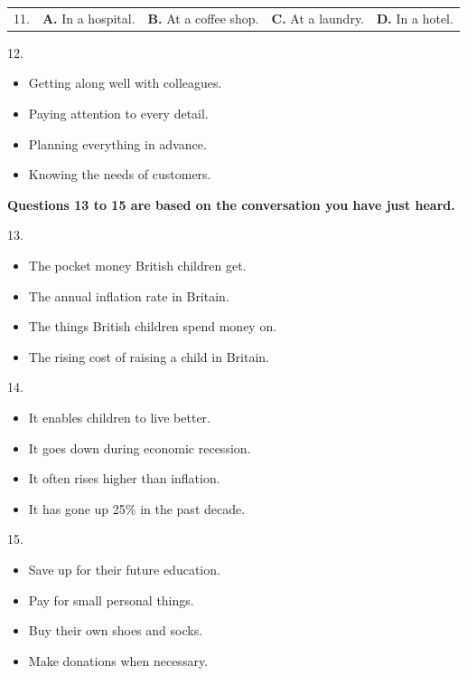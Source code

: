 \documentclass[UTF8,11pt]{ctexart}
\begin{document}
\noindent\begin{tabularx}{\linewidth}{@{}lXXXX@{}}11. & \textbf{A.} In a hospital. & \textbf{B.} At a coffee shop. & \textbf{C.} At a laundry. & \textbf{D.} In a hotel.\\\end{tabularx}\par

12.


\begin{itemize}[leftmargin=2em,itemsep=.2em,topsep=.4em]\item[A.] Getting along well with colleagues.
\item[B.] Paying attention to every detail.
\item[C.] Planning everything in advance.
\item[D.] Knowing the needs of customers.
\end{itemize}

\textbf{Questions 13 to 15 are based on the conversation you have just heard.}


13.


\begin{itemize}[leftmargin=2em,itemsep=.2em,topsep=.4em]\item[A.] The pocket money British children get.
\item[B.] The annual inflation rate in Britain.
\item[C.] The things British children spend money on.
\item[D.] The rising cost of raising a child in Britain.
\end{itemize}

14.


\begin{itemize}[leftmargin=2em,itemsep=.2em,topsep=.4em]\item[A.] It enables children to live better.
\item[B.] It goes down during economic recession.
\item[C.] It often rises higher than inflation.
\item[D.] It has gone up 25\% in the past decade.
\end{itemize}

15.


\begin{itemize}[leftmargin=2em,itemsep=.2em,topsep=.4em]\item[A.] Save up for their future education.
\item[B.] Pay for small personal things.
\item[C.] Buy their own shoes and socks.
\item[D.] Make donations when necessary.
\end{itemize}
\end{document}

